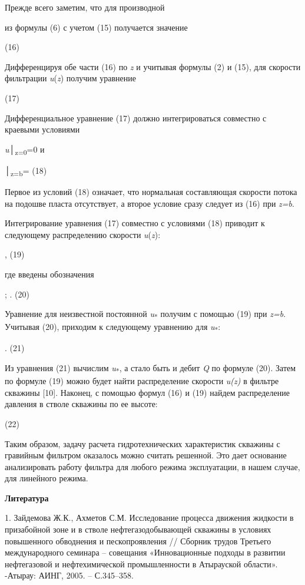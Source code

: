 Прежде всего заметим, что для производной

из формулы (6) с учетом (15) получается значение




(16)

Дифференцируя обе части (16) по \emph{z} и учитывая формулы (2) и (15),
для скорости фильтрации \emph{u}(\emph{z}) получим уравнение


(17)

Дифференциальное уравнение (17) должно интегрироваться совместно с
краевыми условиями

\emph{u}│\textsubscript{z=0}=0 и

│\textsubscript{z=b}=
(18)

Первое из условий (18) означает, что нормальная составляющая скорости
потока на подошве пласта отсутствует, а второе условие сразу следует из
(16) при \emph{z=b}.

Интегрирование уравнения (17) совместно с условиями (18) приводит к
следующему распределению скорости \emph{u}(\emph{z}):

,
(19)

где введены обозначения

;
.
(20)

Уравнение для неизвестной постоянной \emph{u}\textsubscript{*} получим с
помощью (19) при \emph{z=b}. Учитывая (20), приходим к следующему
уравнению для \emph{u}\textsubscript{*}:



.
(21)

Из уравнения (21) вычислим \emph{u}\textsubscript{*}, а стало быть и
дебит \emph{Q} по формуле (20). Затем по формуле (19) можно будет найти
распределение скорости \emph{u(z)} в фильтре скважины {[}10{]}. Наконец,
с помощью формул (16) и (19) найдем распределение давления в стволе
скважины по ее высоте:


(22)

Таким образом, задачу расчета гидротехнических характеристик скважины с
гравийным фильтром оказалось можно считать решенной. Это дает основание
анализировать работу фильтра для любого режима эксплуатации, в нашем
случае, для линейного режима.

{\bfseries Литература}

1. Зайдемова Ж.К., Ахметов С.М. Исследование процесса движения жидкости в
призабойной зоне и в стволе нефтегазодобывающей скважины в условиях
повышенного обводнения и пескопроявления // Сборник трудов Третьего
международного семинара -- совещания «Инновационные подходы в развитии
нефтегазовой и нефтехимической промышленности в Атырауской области».
-Атырау: АИНГ, 2005. -- С.345--358.


